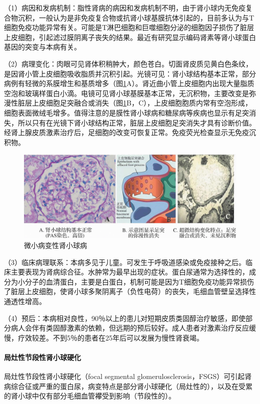 （1）病因和发病机制：脂性肾病的病因和发病机制不明，由于肾小球内无免疫复合物沉积，一般认为是非免疫复合物或抗肾小球基膜抗体引起的，目前多认为与T细胞免疫功能异常有关。可能是T淋巴细胞和巨噬细胞分泌的细胞因子损伤了脏层上皮细胞，引起滤过膜阴离子丧失的结果。最近有研究显示编码肾素等肾小球蛋白基因的突变与本病有关。

（2）病理变化：肉眼可见肾体积稍肿大，颜色苍白。切面肾皮质见黄白色条纹，是因肾小管上皮细胞吸收脂质并沉积引起。光镜可见：肾小球结构基本正常，部分病例有轻微的系膜增生和基质增多（图\ref{fig10-18}A）。肾近曲小管上皮细胞内出现大量脂质空泡和玻璃样蛋白小滴。电镜可见肾小球基膜基本正常，无沉积物，主要改变是弥漫性脏层上皮细胞足突融合或消失（图\ref{fig10-18}B，C），上皮细胞胞质内常有空泡形成，细胞表面微绒毛增多。值得注意的是膜性肾小球病和糖尿病等疾病也显示有足突消失，所以只有在光镜下肾小球结构正常，脏层上皮细胞足突消失才具有诊断价值。经肾上腺皮质激素治疗后，足细胞的改变可恢复正常。免疫荧光检查显示无免疫沉积物。

\begin{figure}[!htbp]
 \centering
 \includegraphics{./images/Image00166.jpg}
 \captionsetup{justification=centering}
 \caption{微小病变性肾小球病}
 \label{fig10-18}
  \end{figure} 

（3）临床病理联系：本病多见于儿童。可发生于呼吸道感染或免疫接种之后。临床主要表现为肾病综合征。水肿常为最早出现的症状。蛋白尿通常为选择性的，成分为小分子的血清蛋白，主要是白蛋白，机制可能是因为T细胞免疫功能异常损伤了脏层上皮细胞，使肾小球多聚阴离子（负性电荷）的丧失，毛细血管壁呈选择性通透性增高。

（4）预后：本病相对良性，90％以上的患儿对短期皮质类固醇治疗敏感，即使部分病人会伴有类固醇激素的依赖，但远期的预后较好。成人患者对激素治疗反应缓慢，疗效较差。不到5％的患者在25年后可以发展为慢性肾衰竭。

\paragraph{局灶性节段性肾小球硬化}
局灶性节段性肾小球硬化（focal segmental
glomerulosclerosis，FSGS）可引起肾病综合征或严重的蛋白尿，病变特点是部分肾小球硬化（局灶性的），以及在受累的肾小球中仅有部分毛细血管襻受到影响（节段性的）。

